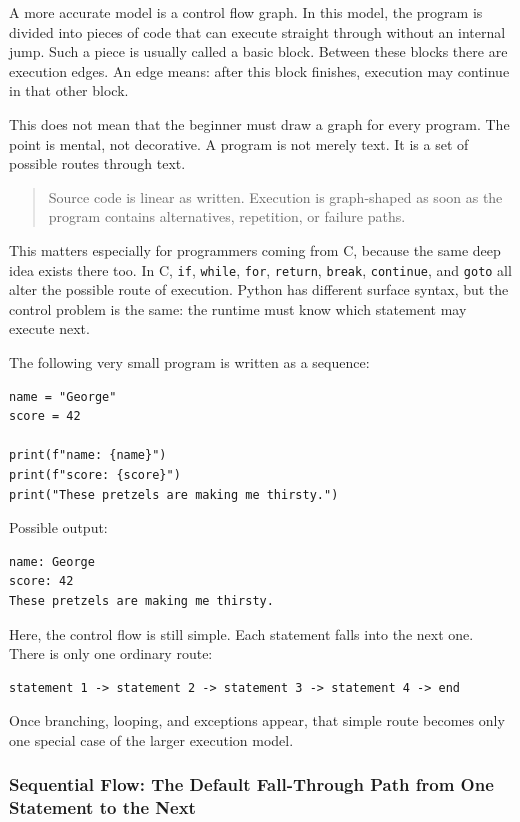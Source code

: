 \documentclass[a4paper,twoside]{report}
\begin{document}
A more accurate model is a control flow graph. In this model, the program is divided into pieces of code that can execute straight through without an internal jump. Such a piece is usually called a basic block. Between these blocks there are execution edges. An edge means: after this block finishes, execution may continue in that other block.

This does not mean that the beginner must draw a graph for every program. The point is mental, not decorative. A program is not merely text. It is a set of possible routes through text.

\begin{quote}
Source code is linear as written. Execution is graph-shaped as soon as the program contains alternatives, repetition, or failure paths.
\end{quote}

This matters especially for programmers coming from C, because the same deep idea exists there too. In C, \texttt{if}, \texttt{while}, \texttt{for}, \texttt{return}, \texttt{break}, \texttt{continue}, and \texttt{goto} all alter the possible route of execution. Python has different surface syntax, but the control problem is the same: the runtime must know which statement may execute next.

The following very small program is written as a sequence:

\begin{verbatim}
name = "George"
score = 42

print(f"name: {name}")
print(f"score: {score}")
print("These pretzels are making me thirsty.")
\end{verbatim}

Possible output:

\begin{verbatim}
name: George
score: 42
These pretzels are making me thirsty.
\end{verbatim}

Here, the control flow is still simple. Each statement falls into the next one. There is only one ordinary route:

\begin{verbatim}
statement 1 -> statement 2 -> statement 3 -> statement 4 -> end
\end{verbatim}

Once branching, looping, and exceptions appear, that simple route becomes only one special case of the larger execution model.

\subsubsection{Sequential Flow: The Default Fall-Through Path from One Statement to the Next}
\end{document}
